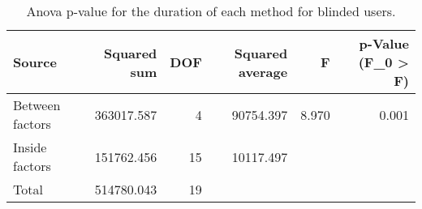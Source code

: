 
\begin{table}[!htb]
\centering
\caption{Anova p-value for the duration of each method for blinded users.}
\label{tab:anova_duration_var}
\begin{tabular}{lrrrrr}
\toprule
         Source &  Squared sum &  DOF & Squared average &     F & p-Value (F\_0 > F) \\
\midrule
Between factors &   363017.587 &    4 &       90754.397 & 8.970 &             0.001 \\
 Inside factors &   151762.456 &   15 &       10117.497 &       &                   \\
          Total &   514780.043 &   19 &                 &       &                   \\
\bottomrule
\end{tabular}
\end{table}

